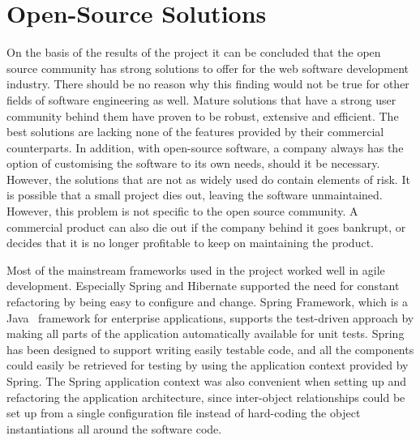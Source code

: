 \section{Open-Source Solutions}
\label{toc:conclusions:oss}

On the basis of the results of the project it can be concluded that 
the open source community has strong solutions to offer for the web 
software development industry. There should be no reason why this 
finding would not be true for other fields of software engineering as 
well. Mature  solutions that have a strong user community 
behind them have proven to be robust, extensive and efficient. The 
best  solutions are lacking none of the features provided 
by their commercial counterparts. In addition, with open-source 
software, a company always has the option of customising the software 
to its own needs, should it be necessary. However, the  
solutions that are not as widely used do contain elements of risk. It 
is possible that a small  project dies out, leaving the 
software unmaintained. However, this problem is not specific to the 
open source community. A commercial product can also die out if the 
company behind it goes bankrupt, or decides that it is no longer 
profitable to keep on maintaining the product.

Most of the mainstream  frameworks used in the project 
worked well in agile development. Especially Spring and Hibernate 
supported the need for constant refactoring by being easy to configure 
and change. Spring Framework, which is a Java~ framework 
for enterprise applications, supports the test-driven approach by 
making all parts of the application automatically available for unit 
tests. Spring has been designed to support writing easily testable 
code, and all the components could easily be retrieved for testing by 
using the application context provided by Spring. The Spring 
application context was also convenient when setting up and 
refactoring the application architecture, since inter-object 
relationships could be set up from a single configuration file instead 
of hard-coding the object instantiations all around the software code.

